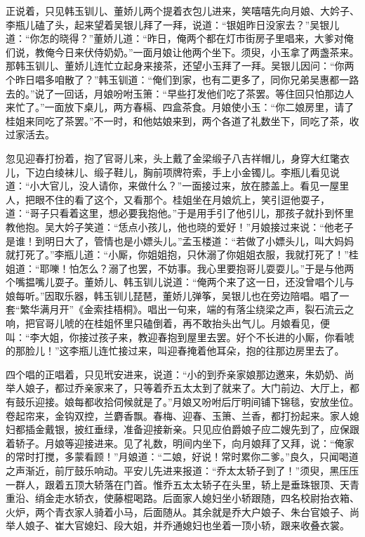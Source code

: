 正说着，只见韩玉钏儿、董娇儿两个提着衣包儿进来，笑嘻嘻先向月娘、大妗子、李瓶儿磕了头，起来望着吴银儿拜了一拜，说道：“银姐昨日没家去？”吴银儿道：“你怎的晓得？”董娇儿道：“昨日，俺两个都在灯市街房子里唱来，大爹对俺们说，教俺今日来伏侍奶奶。”一面月娘让他两个坐下。须臾，小玉拿了两盏茶来。那韩玉钏儿、董娇儿连忙立起身来接茶，还望小玉拜了一拜。吴银儿因问：“你两个昨日唱多咱散了？”韩玉钏道：“俺们到家，也有二更多了，同你兄弟吴惠都一路去的。”说了一回话，月娘吩咐玉箫：“早些打发他们吃了茶罢。等住回只怕那边人来忙了。”一面放下桌儿，两方春槅、四盒茶食。月娘使小玉：“你二娘房里，请了桂姐来同吃了茶罢。”不一时，和他姑娘来到，两个各道了礼数坐下，同吃了茶，收过家活去。

忽见迎春打扮着，抱了官哥儿来，头上戴了金梁缎子八吉祥帽儿，身穿大红氅衣儿，下边白绫袜儿、缎子鞋儿，胸前项牌符索，手上小金镯儿。李瓶儿看见说道：“小大官儿，没人请你，来做什么？”一面接过来，放在膝盖上。看见一屋里人，把眼不住的看了这个，又看那个。桂姐坐在月娘炕上，笑引逗他耍子，道：“哥子只看着这里，想必要我抱他。”于是用手引了他引儿，那孩子就扑到怀里教他抱。吴大妗子笑道：“恁点小孩儿，他也晓的爱好！”月娘接过来说：“他老子是谁！到明日大了，管情也是小嫖头儿。”孟玉楼道：“若做了小嫖头儿，叫大妈妈就打死了。”李瓶儿道：“小厮，你姐姐抱，只休溺了你姐姐衣服，我就打死了！”桂姐道：“耶嚛！怕怎么？溺了也罢，不妨事。我心里要抱哥儿耍耍儿。”于是与他两个嘴揾嘴儿耍子。董娇儿、韩玉钏儿说道：“俺两个来了这一日，还没曾唱个儿与娘每听。”因取乐器，韩玉钏儿琵琶，董娇儿弹筝，吴银儿也在旁边陪唱。唱了一套“繁华满月开”《金索挂梧桐》。唱出一句来，端的有落尘绕梁之声，裂石流云之响，把官哥儿唬的在桂姐怀里只磕倒着，再不敢抬头出气儿。月娘看见，便叫：“李大姐，你接过孩子来，教迎春抱到屋里去罢。好个不长进的小厮，你看唬的那脸儿！”这李瓶儿连忙接过来，叫迎春掩着他耳朵，抱的往那边房里去了。

四个唱的正唱着，只见玳安进来，说道：“小的到乔亲家娘那边邀来，朱奶奶、尚举人娘子，都过乔亲家来了，只等着乔五太太到了就来了。大门前边、大厅上，都有鼓乐迎接。娘每都收拾伺候就是了。”月娘又吩咐后厅明间铺下锦毯，安放坐位。卷起帘来，金钩双控，兰麝香飘。春梅、迎春、玉箫、兰香，都打扮起来。家人媳妇都插金戴银，披红垂绿，准备迎接新亲。只见应伯爵娘子应二嫂先到了，应保跟着轿子。月娘等迎接进来。见了礼数，明间内坐下，向月娘拜了又拜，说：“俺家的常时打搅，多蒙看顾！”月娘道：“二娘，好说！常时累你二爹。”良久，只闻喝道之声渐近，前厅鼓乐响动。平安儿先进来报道：“乔太太轿子到了！”须臾，黑压压一群人，跟着五顶大轿落在门首。惟乔五太太轿子在头里，轿上是垂珠银顶、天青重沿、绡金走水轿衣，使藤棍喝路。后面家人媳妇坐小轿跟随，四名校尉抬衣箱、火炉，两个青衣家人骑着小马，后面随从。其余就是乔大户娘子、朱台官娘子、尚举人娘子、崔大官媳妇、段大姐，并乔通媳妇也坐着一顶小轿，跟来收叠衣裳。

